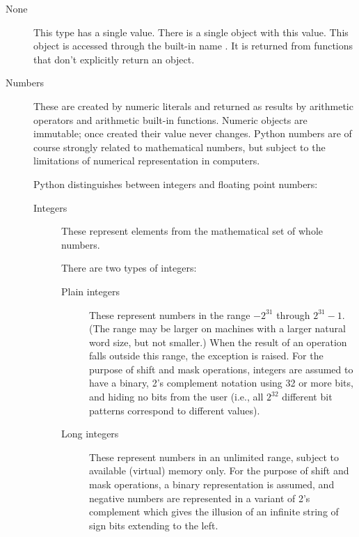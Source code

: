 \begin{description}

\item[None]
This type has a single value.  There is a single object with this value.
This object is accessed through the built-in name \verb@None@.
It is returned from functions that don't explicitly return an object.

\item[Numbers]
These are created by numeric literals and returned as results by
arithmetic operators and arithmetic built-in functions.  Numeric
objects are immutable; once created their value never changes.  Python
numbers are of course strongly related to mathematical numbers, but
subject to the limitations of numerical representation in computers.

Python distinguishes between integers and floating point numbers:

\begin{description}
\item[Integers]
These represent elements from the mathematical set of whole numbers.

There are two types of integers:

\begin{description}

\item[Plain integers]
These represent numbers in the range $-2^{31}$ through $2^{31}-1$.
(The range may be larger on machines with a larger natural word
size, but not smaller.)
When the result of an operation falls outside this range, the
exception \verb@OverflowError@ is raised.
For the purpose of shift and mask operations, integers are assumed to
have a binary, 2's complement notation using 32 or more bits, and
hiding no bits from the user (i.e., all $2^{32}$ different bit
patterns correspond to different values).

\item[Long integers]
These represent numbers in an unlimited range, subject to available
(virtual) memory only.  For the purpose of shift and mask operations,
a binary representation is assumed, and negative numbers are
represented in a variant of 2's complement which gives the illusion of
an infinite string of sign bits extending to the left.

\end{description} %


\end{description}
\end{description}
